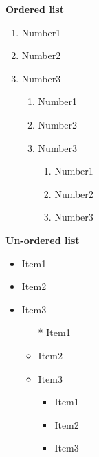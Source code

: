 \documentclass{article}
\begin{document}
	\begin{multicols}{2}
		\noindent\begin{flushleft}
			\begin{large}{\textbf{Ordered list}}\end{large}
		\end{flushleft}
		\begin{enumerate}
			\item Number1
			\item Number2
			\item Number3
				\begin{enumerate}[\color{red}I]
					\item Number1
					\item Number2
					\item Number3
						\begin{enumerate}[A]
							\item Number1
							\item Number2
							\item Number3
						\end{enumerate}
				\end{enumerate}
		\end{enumerate}
		\noindent \begin{flushleft}
			\begin{LARGE}
				\textbf{Un-ordered list}
			\end{LARGE}
		\end{flushleft}
		\begin{itemize}
			\item Item1
			\item Item2
			\item Item3
			\begin{itemize}
				\item[*]Item1
				\item Item2
				\item Item3
				\begin{itemize}
					\item Item1
					\item Item2
					\item Item3
				\end{itemize}
			\end{itemize}
		\end{itemize}
	\end{multicols}
\end{document}
